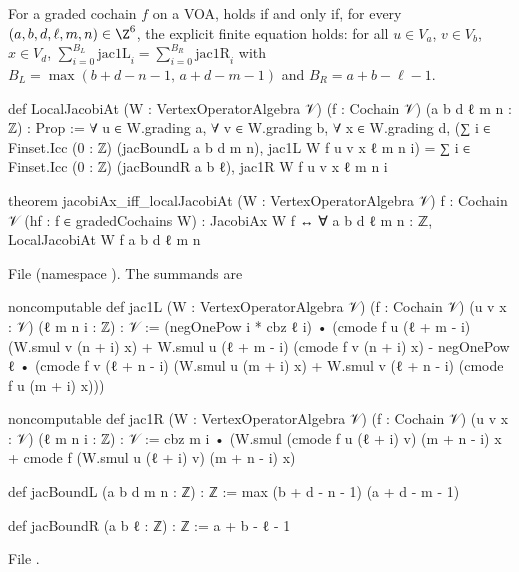 \begin{theorem}\label{l03:thm:jacobilocal}
For a graded cochain $f$ on a VOA,  holds if and only if, for every
$(a,b,d,\ell,m,n)\in\Z^6$, the explicit finite equation  holds:
for all $u\in V_a$, $v\in V_b$, $x\in V_d$,
$\sum_{i=0}^{B_L}\mathrm{jac1L}_i = \sum_{i=0}^{B_R}\mathrm{jac1R}_i$ with
$B_L = \max(b+d-n-1,\,a+d-m-1)$ and $B_R = a+b-\ell-1$.
\end{theorem}
\begin{leancode}
def LocalJacobiAt (W : VertexOperatorAlgebra 𝒱) (f : Cochain 𝒱) (a b d ℓ m n : ℤ) : Prop :=
  ∀ u ∈ W.grading a, ∀ v ∈ W.grading b, ∀ x ∈ W.grading d,
    (∑ i ∈ Finset.Icc (0 : ℤ) (jacBoundL a b d m n), jac1L W f u v x ℓ m n i)
      = ∑ i ∈ Finset.Icc (0 : ℤ) (jacBoundR a b ℓ), jac1R W f u v x ℓ m n i

theorem jacobiAx_iff_localJacobiAt (W : VertexOperatorAlgebra 𝒱) {f : Cochain 𝒱}
    (hf : f ∈ gradedCochains W) :
    JacobiAx W f ↔ ∀ a b d ℓ m n : ℤ, LocalJacobiAt W f a b d ℓ m n
\end{leancode}
File  (namespace ). The
summands are
\begin{leancode}
noncomputable def jac1L (W : VertexOperatorAlgebra 𝒱) (f : Cochain 𝒱) (u v x : 𝒱)
    (ℓ m n i : ℤ) : 𝒱 :=
  (negOnePow i * cbz ℓ i) •
    (cmode f u (ℓ + m - i) (W.smul v (n + i) x)
      + W.smul u (ℓ + m - i) (cmode f v (n + i) x)
      - negOnePow ℓ •
        (cmode f v (ℓ + n - i) (W.smul u (m + i) x)
          + W.smul v (ℓ + n - i) (cmode f u (m + i) x)))

noncomputable def jac1R (W : VertexOperatorAlgebra 𝒱) (f : Cochain 𝒱) (u v x : 𝒱)
    (ℓ m n i : ℤ) : 𝒱 :=
  cbz m i •
    (W.smul (cmode f u (ℓ + i) v) (m + n - i) x
      + cmode f (W.smul u (ℓ + i) v) (m + n - i) x)

def jacBoundL (a b d m n : ℤ) : ℤ := max (b + d - n - 1) (a + d - m - 1)

def jacBoundR (a b ℓ : ℤ) : ℤ := a + b - ℓ - 1
\end{leancode}
File .

